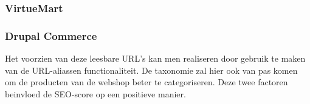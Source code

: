 \subsubsection{VirtueMart}
\subsubsection{Drupal Commerce}
Het voorzien van deze leesbare URL's kan men realiseren door gebruik te maken van de URL-aliassen functionaliteit. De taxonomie zal hier ook van pas komen om de producten van de webshop beter te categoriseren. Deze twee factoren beinvloed de SEO-score op een positieve manier.
